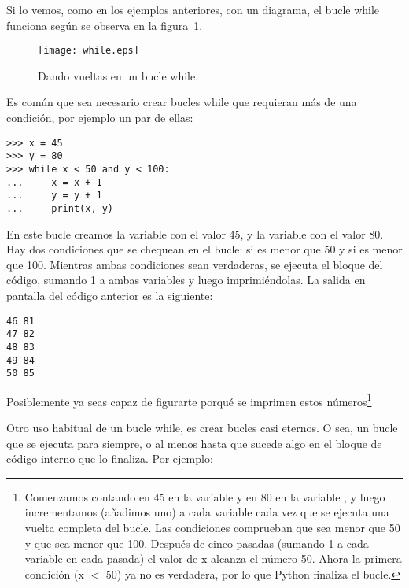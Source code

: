 Si lo vemos, como en los ejemplos anteriores, con un diagrama, el bucle while funciona según se observa en la figura~\ref{while}.

\begin{figure}
\begin{center}
\texttt{[image: while.eps]}
\end{center}
\caption{Dando vueltas en un bucle while.}\label{while}
\end{figure}

Es común que sea necesario crear bucles while que requieran más de una condición, por ejemplo un par de ellas:

\begin{listing}
\begin{verbatim}
>>> x = 45
>>> y = 80
>>> while x < 50 and y < 100:
...     x = x + 1
...     y = y + 1
...     print(x, y)
\end{verbatim}
\end{listing}

En este bucle creamos la variable  con el valor 45, y la variable  con el valor 80.  Hay dos condiciones que se chequean en el bucle: si  es menor que 50 y si  es menor que 100. Mientras ambas condiciones sean verdaderas, se ejecuta el bloque del código, sumando 1 a ambas variables y luego imprimiéndolas.  La salida en pantalla del código anterior es la siguiente:

\begin{listing}
\begin{verbatim}
46 81
47 82
48 83
49 84
50 85
\end{verbatim}
\end{listing}

Posiblemente ya seas capaz de figurarte porqué se imprimen estos números\footnote{Comenzamos contando en 45 en la variable  y en 80 en la variable , y luego incrementamos (añadimos uno) a cada variable cada vez que se ejecuta una vuelta completa del bucle.  Las condiciones comprueban que  sea menor que 50 y que  sea menor que 100.  Después de cinco pasadas (sumando 1 a cada variable en cada pasada) el valor de x alcanza el número 50.  Ahora la primera condición (x $<$ 50) ya no es verdadera, por lo que Python finaliza el bucle.}

Otro uso habitual de un bucle while, es crear bucles casi eternos. O sea, un bucle que se ejecuta para siempre, o al menos hasta que sucede algo en el bloque de código interno que lo finaliza. Por ejemplo:

